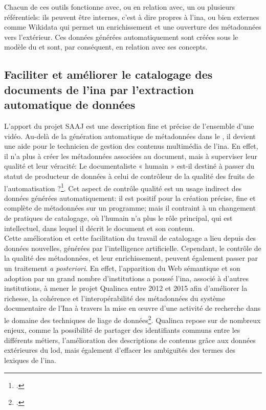 Chacun de ces outils fonctionne avec, ou en relation avec, un ou plusieurs référentiels: ils peuvent être internes, c'est à dire propres à l'\ac{ina}, ou bien externes comme Wikidata qui permet un enrichissement et une ouverture des métadonnées vers l'extérieur. Ces données générées automatiquement sont créées sous le modèle du \ldd et sont, par conséquent, en relation avec ses concepts. 

\subsection{\label{III-B-3-b}Faciliter et améliorer le catalogage des documents de l’\ac{ina} par l’extraction automatique de données}

L'apport du projet SAAJ est une description fine et précise de l'ensemble d'une vidéo. Au-delà de la génération automatique de métadonnées dans le \ldd, il devient une aide pour le technicien de gestion des contenus multimédia de l'\ac{ina}. En effet, il n'a plus à créer les métadonnées associées au document, mais à superviser leur qualité et leur véracité: \og Le documentaliste « humain » est-il destiné à
passer du statut de producteur de données à celui de contrôleur de la qualité des fruits de l’automatisation ?\fg{}\footcite[p.134]{alquier_production_2017}. Cet aspect de contrôle qualité est un usage indirect des données générées automatiquement: il est positif pour la création précise, fine et complète de métadonnées sur un programme; mais il contraint à un changement de pratiques de catalogage, où l'humain n'a plus le rôle principal, qui est intellectuel, dans lequel il décrit le document et son contenu. \\

Cette amélioration et cette facilitation du travail de catalogage a lieu depuis des données nouvelles, générées par l'intelligence artificielle. Cependant, le contrôle de la qualité des métadonnées, et leur enrichissement, peuvent également passer par un traitement \textit{a posteriori}. En effet, l'apparition du Web sémantique et son adoption par un grand nombre d'institutions a poussé l'\ac{ina}, associé à d'autres institutions, à mener le projet Qualinca entre 2012 et 2015 afin \og d'améliorer la richesse, la cohérence et l’interopérabilité des métadonnées du système documentaire de l’Ina à travers la mise en œuvre d’une activité de recherche dans le domaine des techniques de liage de données\fg{}\footcite[p.129]{alquier_production_2017}. Qualinca repose sur de nombreux enjeux, comme la possibilité de partager des identifiants communs entre les différents métiers, l'amélioration des descriptions de contenus grâce aux données extérieures du \ac{lod}, mais également d'effacer les ambiguïtés des termes des lexiques de l'\ac{ina}.\\

